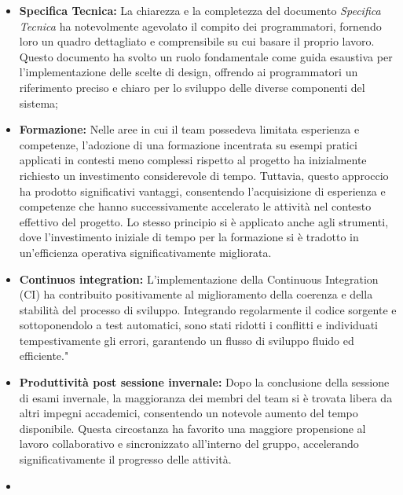 \begin{itemize}
    \item \textbf{Specifica Tecnica:} La chiarezza e la completezza del documento \textit{Specifica Tecnica} ha notevolmente agevolato il compito dei programmatori, fornendo loro un quadro dettagliato e comprensibile su cui basare il proprio lavoro. Questo documento ha svolto un ruolo fondamentale come guida esaustiva per l'implementazione delle scelte di design, offrendo ai programmatori un riferimento preciso e chiaro per lo sviluppo delle diverse componenti del sistema;
    \item \textbf{Formazione:} Nelle aree in cui il team possedeva limitata esperienza e competenze, l'adozione di una formazione incentrata su esempi pratici applicati in contesti meno complessi rispetto al progetto ha inizialmente richiesto un investimento considerevole di tempo. Tuttavia, questo approccio ha prodotto significativi vantaggi, consentendo l'acquisizione di esperienza e competenze che hanno successivamente accelerato le attività nel contesto effettivo del progetto. Lo stesso principio si è applicato anche agli strumenti, dove l'investimento iniziale di tempo per la formazione si è tradotto in un'efficienza operativa significativamente migliorata.
    \item \textbf{Continuos integration:} L'implementazione della Continuous Integration (CI) ha contribuito positivamente al miglioramento della coerenza e della stabilità del processo di sviluppo. Integrando regolarmente il codice sorgente e sottoponendolo a test automatici, sono stati ridotti i conflitti e individuati tempestivamente gli errori, garantendo un flusso di sviluppo fluido ed efficiente."
    \item \textbf{Produttività post sessione invernale:} Dopo la conclusione della sessione di esami invernale, la maggioranza dei membri del team si è trovata libera da altri impegni accademici, consentendo un notevole aumento del tempo disponibile. Questa circostanza ha favorito una maggiore propensione al lavoro collaborativo e sincronizzato all'interno del gruppo, accelerando significativamente il progresso delle attività.
    \item {}
\end{itemize}
